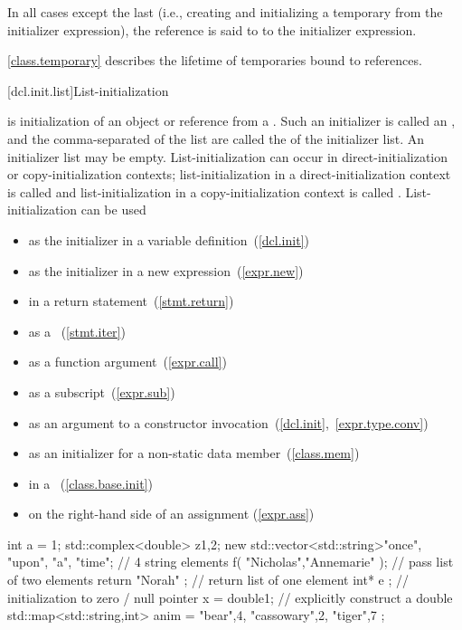 In all cases except the last (i.e., creating and initializing a temporary from the
initializer expression), the reference is said to  to the
initializer expression.

\pnum
\enternote
\ref{class.temporary} describes the lifetime of temporaries bound to references.
\exitnote

[dcl.init.list]{List-initialization}%

\pnum
{} is initialization of an object or reference from a
. Such an initializer is called an , and the comma-separated  of the list are
called the  of the initializer list. An initializer list may be empty.
List-initialization can occur in direct-initialization or copy-initialization contexts;
list-initialization in a direct-initialization context is called
 and list-initialization in a
copy-initialization context is called . \enternote
List-initialization can be used

\begin{itemize}
\item as the initializer in a variable definition~(\ref{dcl.init})
\item as the initializer in a new expression~(\ref{expr.new})
\item in a return statement~(\ref{stmt.return})
\item as a ~(\ref{stmt.iter})
\item as a function argument~(\ref{expr.call})
\item as a subscript~(\ref{expr.sub})
\item as an argument to a constructor invocation~(\ref{dcl.init},~\ref{expr.type.conv})
\item as an initializer for a non-static data member~(\ref{class.mem})
\item in a ~(\ref{class.base.init})
\item on the right-hand side of an assignment (\ref{expr.ass})
\end{itemize}

\enterexample
\begin{codeblock}
int a = {1};
std::complex<double> z{1,2};
new std::vector<std::string>{"once", "upon", "a", "time"};  // 4 string elements
f( {"Nicholas","Annemarie"} );  // pass list of two elements
return { "Norah" };             // return list of one element
int* e {};                      // initialization to zero / null pointer
x = double{1};                  // explicitly construct a double 
std::map<std::string,int> anim = { {"bear",4}, {"cassowary",2}, {"tiger",7} };
\end{codeblock}
\exitexample \exitnote

